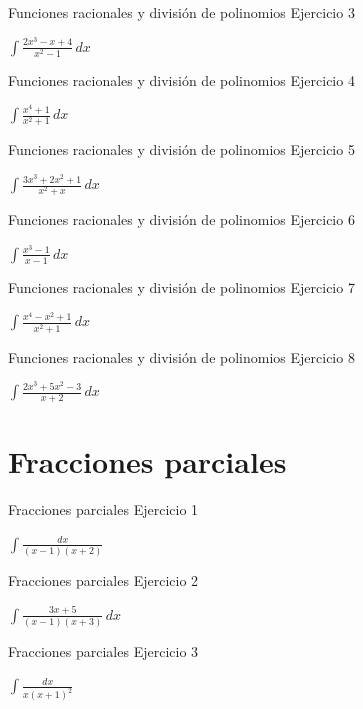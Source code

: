\documentclass[10pt,aspectratio=169]{beamer}
\newcommand{\ejercicio}[1]{%
  \begin{center}
  \vfill
  {\fontsize{24}{30}\selectfont #1}
  \vfill
  \end{center}
}
\begin{document}
\begin{frame}{Funciones racionales y división de polinomios}
\small Ejercicio 3
\ejercicio{$\displaystyle \int \frac{2x^3-x+4}{x^2-1}\,dx$}
\end{frame}

\begin{frame}{Funciones racionales y división de polinomios}
\small Ejercicio 4
\ejercicio{$\displaystyle \int \frac{x^4+1}{x^2+1}\,dx$}
\end{frame}

\begin{frame}{Funciones racionales y división de polinomios}
\small Ejercicio 5
\ejercicio{$\displaystyle \int \frac{3x^3+2x^2+1}{x^2+x}\,dx$}
\end{frame}

\begin{frame}{Funciones racionales y división de polinomios}
\small Ejercicio 6
\ejercicio{$\displaystyle \int \frac{x^3-1}{x-1}\,dx$}
\end{frame}

\begin{frame}{Funciones racionales y división de polinomios}
\small Ejercicio 7
\ejercicio{$\displaystyle \int \frac{x^4-x^2+1}{x^2+1}\,dx$}
\end{frame}

\begin{frame}{Funciones racionales y división de polinomios}
\small Ejercicio 8
\ejercicio{$\displaystyle \int \frac{2x^3+5x^2-3}{x+2}\,dx$}
\end{frame}

\section{Fracciones parciales}

\begin{frame}{Fracciones parciales}
\small Ejercicio 1
\ejercicio{$\displaystyle \int \frac{dx}{(x-1)(x+2)}$}
\end{frame}

\begin{frame}{Fracciones parciales}
\small Ejercicio 2
\ejercicio{$\displaystyle \int \frac{3x+5}{(x-1)(x+3)}\,dx$}
\end{frame}

\begin{frame}{Fracciones parciales}
\small Ejercicio 3
\ejercicio{$\displaystyle \int \frac{dx}{x(x+1)^2}$}
\end{frame}
\end{document}
